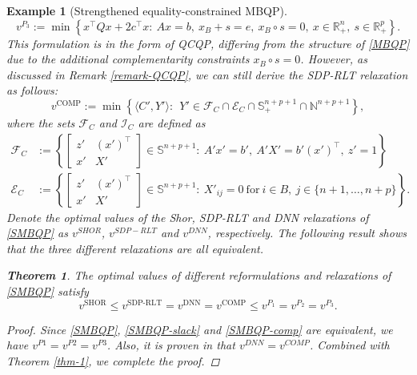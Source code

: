 \documentclass[11pt]{article}
\theoremstyle{plain}
\newtheorem{example}{Example}
\newtheorem{theorem}{Theorem}
\def\<{\big\langle}
\def\>{\big\rangle}
\def\E{\mathcal{E}}
\def\F{\mathcal{F}}
\def\I{\mathcal{I}}
\def\R{\mathbb{R}}
\begin{document}
\begin{example}[Strengthened equality-constrained MBQP]
\begin{equation}\label{SMBQP-comp}
v^{P_3}:=\min\left\{x^{\top} Q x+2 c^{\top}x : \ Ax=b,\ x_B+s= e,\ x_B\circ s=0,\ x\in \R^{n}_+,\ s\in\R_+^{p}\right\}.
\tag{$P_3$}
\end{equation}
This formulation is in the form of QCQP, differing from the structure of \eqref{MBQP} due to the additional complementarity constraints $x_B \circ s = 0$. However, as discussed in Remark \ref{remark-QCQP}, we can still derive the SDP-RLT relaxation as follows:
%
\begin{equation}\label{COMP}
v^{\text{COMP}}:=\min\left\{
\<C',Y'\>  :\  \
Y'\in \F_C\cap\E_C\cap \mathbb{S}_{+}^{n+p+1} \cap\mathbb{N}^{n+p+1}
\right\},\tag{COMP}
\end{equation}
%
where the sets $\F_C$ and $\I_C$ are defined as 
\begin{equation*}
\begin{aligned}
\F_C &:= \left\{
\begin{bmatrix}
    z'&(x')^\top\\
    x'&X'
\end{bmatrix}\in  \mathbb{S}^{n+p+1} :\ 
A' x'  = b',\
A' X' = b'(x')^\top,\ z'=1
\right\}\\
\E_C &:= \left\{\begin{bmatrix}
    z'&(x')^\top\\
    x'&X'
\end{bmatrix}\in\mathbb{S}^{n+p+1}  :\ X'_{ij}=0\ \text{for}\ i\in B,\ j\in \{n+1,\dots,n+p\} \right\}
.
\end{aligned}
\end{equation*}
Denote the optimal values of the Shor, SDP-RLT and DNN relaxations of \eqref{SMBQP} as $v^{SHOR}$, $v^{SDP-RLT}$ and $v^{DNN}$, respectively. The following result shows that the three different relaxations are all equivalent.
\begin{theorem}\label{thm-tightness-SMBQP}
The optimal values of different reformulations and relaxations of \eqref{SMBQP} satisfy
    \begin{equation*}
    v^{\text{SHOR}} \leq 
    v^{\text{SDP-RLT}} =
    v^{\text{DNN}} = 
    v^{\text{COMP}} \leq 
    v^{P_1} =
    v^{P_2} = 
    v^{P_3}.
    \end{equation*}
\end{theorem}
\begin{proof}
    Since \eqref{SMBQP}, \eqref{SMBQP-slack} and \eqref{SMBQP-comp} are equivalent, we have $v^{P1}=v^{P2}=v^{P3}$. Also, it is proven in \cite{ito2018equivalences} that $v^{DNN}=v^{COMP}$. Combined with Theorem \ref{thm-1}, we complete the proof.

\end{proof}
\end{example}
\end{document}
